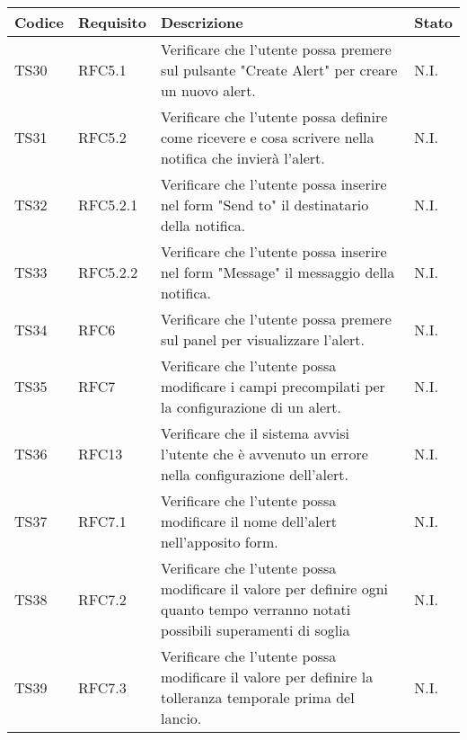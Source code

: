 \begin{table}[!htpb]
	\centering
	\renewcommand{\arraystretch}{2} 
	\begin{tabular}{|l|l|p{10cm}|l|}
		\rowcolor{orange!50}
		\hline
		\textbf{Codice} & \textbf{Requisito}& \textbf{Descrizione} & \textbf{Stato}\\ 
		\hline
		TS30 & RFC5.1 &
			Verificare che l'utente possa premere sul pulsante "Create Alert" per creare un nuovo alert.
			& N.I.\\
		\hline
		TS31 & RFC5.2 &
			Verificare che l’utente possa definire come ricevere e cosa scrivere nella notifica che invierà l'alert. 
			& N.I.\\
		\hline
		TS32 & RFC5.2.1 &
			Verificare che l'utente possa inserire nel form "Send to" il destinatario della notifica.
			& N.I.\\
		\hline
		TS33 & RFC5.2.2 &
			Verificare che l'utente possa inserire nel form "Message" il messaggio della notifica.
			& N.I.\\
		\hline
		TS34 & RFC6 &
			Verificare che l'utente possa premere sul panel per visualizzare l’alert.
			& N.I.\\
		\hline
		TS35 & RFC7 &
			Verificare che l’utente possa modificare i campi precompilati per la configurazione di un alert.
			& N.I.\\
		\hline
		TS36 & RFC13 &
			Verificare che il sistema avvisi l’utente che è avvenuto un errore nella configurazione dell'alert.
			& N.I.\\
		\hline
		TS37 & RFC7.1 &
			Verificare che l'utente possa modificare il nome dell’alert nell’apposito form.
			& N.I.\\
		\hline
		TS38 & RFC7.2 &
			Verificare che l'utente possa modificare il valore per definire ogni quanto tempo verranno notati possibili superamenti di soglia
			& N.I.\\
		\hline
		TS39 & RFC7.3 &
			Verificare che l'utente possa modificare il valore per definire la tolleranza temporale prima del lancio.
			& N.I.\\
		\hline
	\end{tabular}
\end{table}
